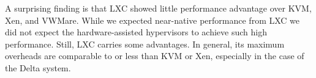 A surprising finding is that LXC showed little performance advantage over KVM,
Xen, and VWMare.  While we expected near-native performance from LXC we did not expect the
hardware-assisted hypervisors to achieve such high performance.  Still, LXC carries some
advantages.  In general, its maximum overheads are comparable to or less than KVM or Xen, especially in the case of the Delta system.   







